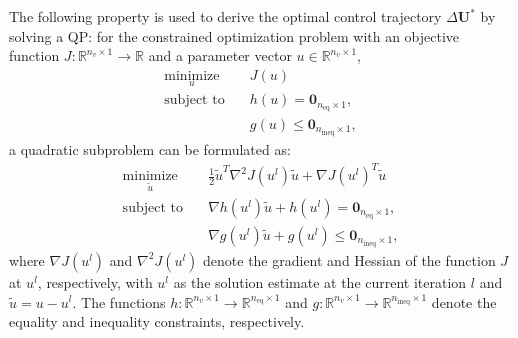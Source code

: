 The following property is used to derive the optimal control trajectory $\Delta \bm{U}^*$ by solving a QP: for the constrained optimization problem with an objective function $J: \mathbb{R}^{n_v \times 1} \to \mathbb{R}$ and a parameter vector $u \in \mathbb{R}^{n_v \times 1}$,
\begin{align*}
    \underset{u}{\text{minimize}} & \quad J(u) \\
    \text{subject to} & \quad h(u) = \bm{0}_{n_{\text{eq}} \times 1}, \\
    & \quad g(u) \leq \bm{0}_{n_{\text{ineq}} \times 1},
\end{align*}
a quadratic subproblem can be formulated as:
\begin{align}
    \underset{\tilde{u}}{\text{minimize}} & \quad \frac{1}{2} \tilde{u}^T \nabla^2 J(u^l) \tilde{u} + \nabla J(u^l)^T \tilde{u} \\
    \text{subject to} & \quad \nabla h(u^l)\tilde{u} + h(u^l) = \bm{0}_{n_{\text{eq}} \times 1}, \\
    & \quad \nabla g(u^l)\tilde{u} + g(u^l) \leq \bm{0}_{n_{\text{ineq}} \times 1} \label{eq:linsubproblemIneqConst},
\end{align}
where \( \nabla J(u^l) \) and $\nabla^2 J(u^l)$ denote the gradient and Hessian of the function \( J \) at \( u^l \), respectively, with \( u^l \) as the solution estimate at the current iteration \( l \) and \( \tilde{u} = u - u^l \). The functions $h: \mathbb{R}^{n_v \times 1} \to \mathbb{R}^{n_{\text{eq}} \times 1}$ and $g: \mathbb{R}^{n_v \times 1} \to \mathbb{R}^{n_{\text{ineq}} \times 1}$ denote the equality and inequality constraints, respectively.

